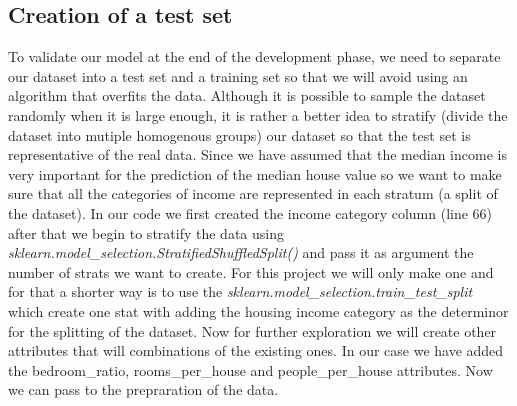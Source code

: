 \documentclass{article}
\begin{document}
\subsection{Creation of a test set}
To validate our model at the end of the development phase, we need to separate our dataset into a test set and a training set so that we will
avoid using an algorithm that overfits the data. Although it is possible to sample the dataset randomly when it is large enough, it is rather a
better idea to stratify (divide the dataset into mutiple homogenous groups) our dataset so that the test set is representative of the real data.
Since we have assumed that the median income is very important for the prediction of the median house value so we want to make sure that all the
categories of income are represented in each stratum (a split of the dataset). In our code we first created the income category column (line 66) after
that we begin to stratify the data using \textit{sklearn.model\_selection.StratifiedShuffledSplit()} and pass it as argument the number of strats
we want to create. For this project we will only make one and for that a shorter way is to use the \textit{sklearn.model\_selection.train\_test\_split} which create one stat
with adding the housing income category as the determinor for the splitting of the dataset. Now for further exploration we will create other
attributes that will combinations of the existing ones. In our case we have added the bedroom\_ratio, rooms\_per\_house and people\_per\_house attributes.
Now we can pass to the prepraration of the data.
\end{document}
